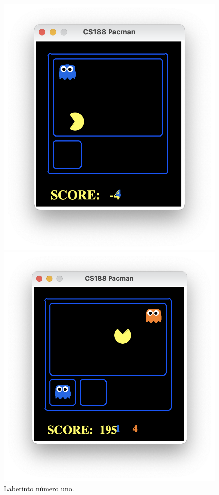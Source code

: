 \documentclass[11pt]{exam}
\begin{document}
\begin{figure}[H]
	\begin{minipage}[c]{0.35\linewidth}
		\includegraphics[scale=0.4]{lab1}
		\vspace*{-7mm}
		\caption{Laberinto número uno.}
		\label{lab1}
	\end{minipage}
	\hfill
	\begin{minipage}[c]{0.35\linewidth}
		\includegraphics[scale=0.4]{lab2}

\end{minipage}
\end{figure}
\end{document}
